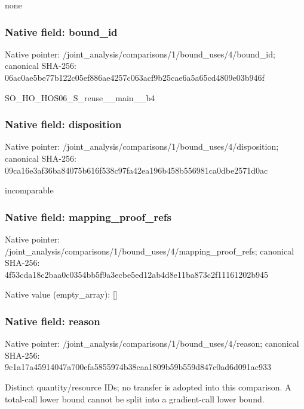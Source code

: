 \documentclass[10pt,a4paper]{article}
\begin{document}
\begingroup\raggedright\sloppy none\par\endgroup

\subsubsection{Native field: bound\_\allowbreak{}id}
Native pointer: /joint\_\allowbreak{}analysis/comparisons/1/bound\_\allowbreak{}uses/4/bound\_\allowbreak{}id; canonical SHA-256: 06ac0ae5be77b122c05ef886ae4257c063acf9b25cae6a5a65cd4809e03b946f

\begingroup\raggedright\sloppy SO\_\allowbreak{}HO\_\allowbreak{}HOS06\_\allowbreak{}S\_\allowbreak{}reuse\_\allowbreak{}\_\allowbreak{}main\_\allowbreak{}\_\allowbreak{}b4\par\endgroup

\subsubsection{Native field: disposition}
Native pointer: /joint\_\allowbreak{}analysis/comparisons/1/bound\_\allowbreak{}uses/4/disposition; canonical SHA-256: 09ca16e3af36ba84075b616f538c97fa42ea196b458b556981ca0dbe2571d0ac

\begingroup\raggedright\sloppy incomparable\par\endgroup

\subsubsection{Native field: mapping\_\allowbreak{}proof\_\allowbreak{}refs}
Native pointer: /joint\_\allowbreak{}analysis/comparisons/1/bound\_\allowbreak{}uses/4/mapping\_\allowbreak{}proof\_\allowbreak{}refs; canonical SHA-256: 4f53cda18c2baa0c0354bb5f9a3ecbe5ed12ab4d8e11ba873c2f11161202b945

Native value (empty\_\allowbreak{}array): []

\subsubsection{Native field: reason}
Native pointer: /joint\_\allowbreak{}analysis/comparisons/1/bound\_\allowbreak{}uses/4/reason; canonical SHA-256: 9e1a17a45914047a700efa5855974b38caa1809b59b559d847c0ad6d091ac933

\begingroup\raggedright\sloppy Distinct quantity/\allowbreak{}resource IDs;\allowbreak{} no transfer is adopted into this comparison. A total-call lower bound cannot be split into a gradient-call lower bound.\par\endgroup
\end{document}
